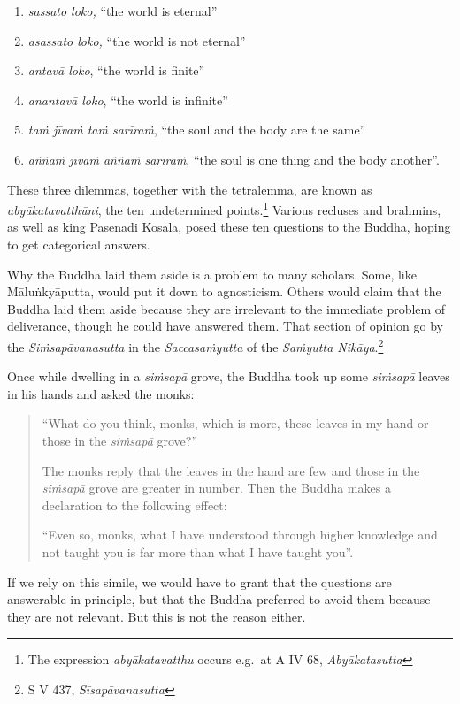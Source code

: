 \begin{enumerate}
\def\labelenumi{\arabic{enumi}.}
\tightlist
\item
  \emph{sassato loko,} ``the world is eternal''
\item
  \emph{asassato loko,} ``the world is not eternal''
\item
  \emph{antavā loko}, ``the world is finite''
\item
  \emph{anantavā loko}, ``the world is infinite''
\item
  \emph{taṁ jīvaṁ taṁ sarīraṁ}, ``the soul and the body are the same''
\item
  \emph{aññaṁ jīvaṁ aññaṁ sarīraṁ}, ``the soul is one thing and the body another''.
\end{enumerate}

These three dilemmas, together with the tetralemma, are known as \emph{abyākatavatthūni}, the ten undetermined points.\footnote{The expression \emph{abyākatavatthu} occurs e.g.~at A IV 68, \emph{Abyākatasutta}} Various recluses and brahmins, as well as king Pasenadi Kosala, posed these ten questions to the Buddha, hoping to get categorical answers.

Why the Buddha laid them aside is a problem to many scholars. Some, like Māluṅkyāputta, would put it down to agnosticism. Others would claim that the Buddha laid them aside because they are irrelevant to the immediate problem of deliverance, though he could have answered them. That section of opinion go by the \emph{Siṁsapāvanasutta} in the \emph{Saccasaṁyutta} of the \emph{Saṁyutta Nikāya}.\footnote{S V 437, \emph{Sīsapāvanasutta}}

Once while dwelling in a \emph{siṁsapā} grove, the Buddha took up some \emph{siṁsapā} leaves in his hands and asked the monks:

\begin{quote}
``What do you think, monks, which is more, these leaves in my hand or those in the \emph{siṁsapā} grove?''

The monks reply that the leaves in the hand are few and those in the \emph{siṁsapā} grove are greater in number. Then the Buddha makes a declaration to the following effect:

``Even so, monks, what I have understood through higher knowledge and not taught you is far more than what I have taught you''.
\end{quote}

If we rely on this simile, we would have to grant that the questions are answerable in principle, but that the Buddha preferred to avoid them because they are not relevant. But this is not the reason either.

